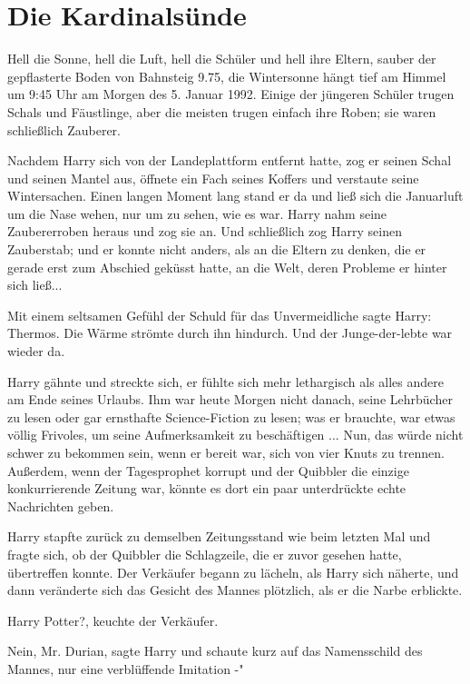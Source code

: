 \chapter{Die Kardinalsünde}

Hell die Sonne, hell die Luft, hell die Schüler und hell ihre Eltern, sauber der
gepflasterte Boden von Bahnsteig 9.75, die Wintersonne hängt tief am Himmel um
9:45 Uhr am Morgen des 5. Januar 1992. Einige der jüngeren Schüler trugen Schals
und Fäustlinge, aber die meisten trugen einfach ihre Roben; sie waren
schließlich Zauberer.

Nachdem Harry sich von der Landeplattform entfernt hatte, zog er seinen Schal
und seinen Mantel aus, öffnete ein Fach seines Koffers und verstaute seine
Wintersachen. Einen langen Moment lang stand er da und ließ sich die Januarluft
um die Nase wehen, nur um zu sehen, wie es war. Harry nahm seine Zaubererroben
heraus und zog sie an. Und schließlich zog Harry seinen Zauberstab; und er
konnte nicht anders, als an die Eltern zu denken, die er gerade erst zum
Abschied geküsst hatte, an die Welt, deren Probleme er hinter sich ließ...

Mit einem seltsamen Gefühl der Schuld für das Unvermeidliche sagte Harry: \glqq{}
Thermos.\grqq{} Die Wärme strömte durch ihn hindurch. Und der Junge-der-lebte
war wieder da.

Harry gähnte und streckte sich, er fühlte sich mehr lethargisch als alles andere
am Ende seines Urlaubs. Ihm war heute Morgen nicht danach, seine Lehrbücher zu
lesen oder gar ernsthafte Science-Fiction zu lesen; was er brauchte, war etwas
völlig Frivoles, um seine Aufmerksamkeit zu beschäftigen ... Nun, das würde
nicht schwer zu bekommen sein, wenn er bereit war, sich von vier Knuts zu
trennen. Außerdem, wenn der Tagesprophet korrupt und der Quibbler die einzige
konkurrierende Zeitung war, könnte es dort ein paar unterdrückte echte
Nachrichten geben.

Harry stapfte zurück zu demselben Zeitungsstand wie beim letzten Mal und fragte
sich, ob der Quibbler die Schlagzeile, die er zuvor gesehen hatte, übertreffen
konnte. Der Verkäufer begann zu lächeln, als Harry sich näherte, und dann
veränderte sich das Gesicht des Mannes plötzlich, als er die Narbe erblickte.

\glqq{}Harry Potter?\grqq{}, keuchte der Verkäufer.

\glqq{}Nein, Mr. Durian\grqq{}, sagte Harry und schaute kurz auf das
Namensschild des Mannes, \glqq{}nur eine verblüffende Imitation -"

